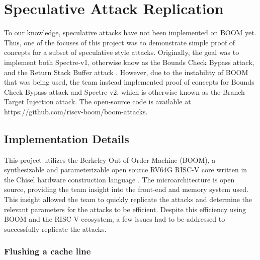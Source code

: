 \section{Speculative Attack Replication}

To our knowledge, speculative attacks have not been implemented on BOOM yet. Thus,
one of the focuses of this project was to demonstrate simple proof of concepts for a
subset of speculative style attacks. Originally, the goal was to implement both 
Spectre-v1, otherwise know as the Bounds Check Bypass attack, and the Return Stack Buffer attack \cite{b3}.
However, due to the instability of BOOM that was being used, the team instead implemented
proof of concepts for Bounds Check Bypass attack and Spectre-v2, which is otherwise known as the
Branch Target Injection attack. The open-source code is available at https://github.com/riscv-boom/boom-attacks.

\subsection{Implementation Details}

This project utilizes the Berkeley Out-of-Order Machine (BOOM), a synthesizable and 
parameterizable open source RV64G RISC-V core written in the Chisel hardware construction language \cite{b49}. 
The microarchitecture is open source, providing the team insight into the front-end and memory system
used. This insight allowed the team to quickly replicate the attacks and determine the relevant parameters
for the attacks to be efficient. Despite this efficiency using BOOM and the RISC-V ecosystem, a few issues
had to be addressed to successfully replicate the attacks.

\subsubsection{Flushing a cache line}


